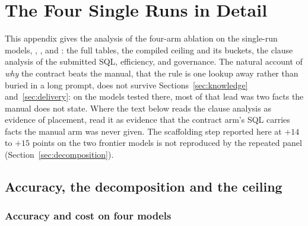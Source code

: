 \section{The Four Single Runs in Detail}
\label{app:single}

This appendix gives the analysis of the four-arm ablation on the
single-run models, \mGLM{}, \mDS{}, \mSON{} and \mGPT{}: the full tables,
the compiled ceiling and its buckets, the clause analysis of the submitted
SQL, efficiency, and governance. The natural account of \emph{why} the
contract beats the manual, that the rule is one lookup away rather than
buried in a long prompt, does not survive Sections~\ref{sec:knowledge}
and~\ref{sec:delivery}: on the models tested there, most of that lead was
two facts the manual does not state. Where the text below reads the clause analysis as evidence of
placement, read it as evidence that the contract arm's SQL carries facts
the manual arm was never given. The scaffolding step reported here at
$+14$ to $+15$ points on the two frontier models is not reproduced by the
repeated \mSol{} panel (Section~\ref{sec:decomposition}).

\subsection{Accuracy, the decomposition and the ceiling}
\label{app:results-k1}

\subsubsection{Accuracy and cost on four models}
\label{sec:headline}

